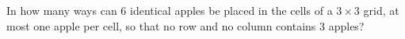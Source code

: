 In how many ways can $6$ identical apples be placed in the cells of a $3\times3$ grid, at most one apple per cell, so that no row and no column contains $3$ apples?
